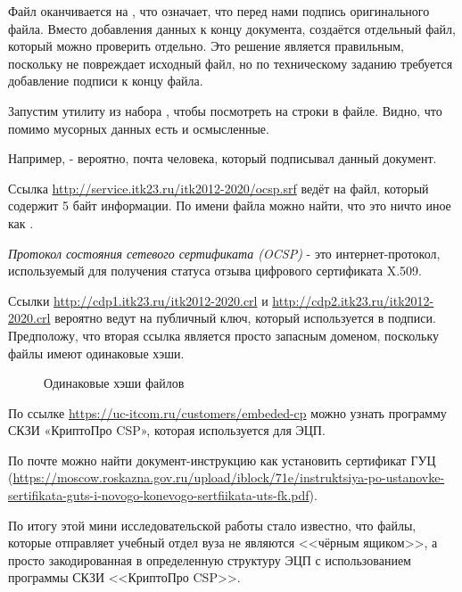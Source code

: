 Файл оканчивается на , что означает, что перед нами подпись оригинального файла. Вместо добавления данных к концу документа,
создаётся отдельный файл, который можно проверить отдельно. Это решение является правильным, поскольку не повреждает исходный файл, но по техническому заданию
требуется добавление подписи к концу файла.

Запустим утилиту  из набора , чтобы посмотреть на строки в файле. Видно, что помимо мусорных данных есть и осмысленные.

Например,  - вероятно, почта человека, который подписывал данный документ.

Ссылка \url{http://service.itk23.ru/itk2012-2020/ocsp.srf} ведёт на файл, который содержит 5 байт информации. По имени файла  
можно найти, что это ничто иное как .

\emph{Протокол состояния сетевого сертификата (OCSP)} - это интернет-протокол, используемый для получения статуса отзыва цифрового сертификата X.509.

Ссылки \url{http://cdp1.itk23.ru/itk2012-2020.crl} и \url{http://cdp2.itk23.ru/itk2012-2020.crl} вероятно ведут на публичный ключ, который используется в подписи.
Предположу, что вторая ссылка является просто запасным доменом, поскольку файлы имеют одинаковые хэши.

\begin{figure}[h!]
  \caption{Одинаковые хэши файлов}
\end{figure}

По ссылке \url{https://uc-itcom.ru/customers/embeded-cp} можно узнать программу СКЗИ «КриптоПро CSP», которая используется для ЭЦП.

По почте  можно найти документ-инструкцию как установить сертификат ГУЦ (\url{https://moscow.roskazna.gov.ru/upload/iblock/71e/instruktsiya-po-ustanovke-sertifikata-guts-i-novogo-konevogo-sertfiikata-uts-fk.pdf}).

По итогу этой мини исследовательской работы стало известно, что файлы, которые отправляет учебный отдел вуза не являются <<чёрным ящиком>>,
а просто закодированная в определенную структуру ЭЦП с использованием программы СКЗИ <<КриптоПро CSP>>.